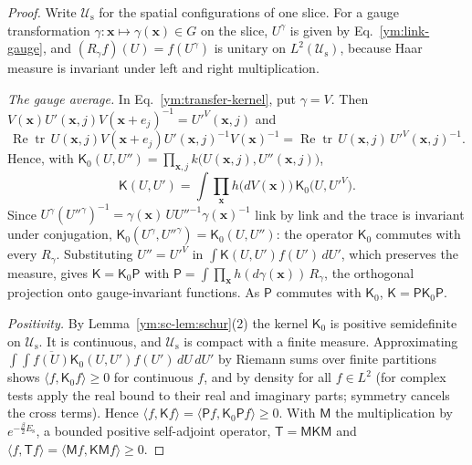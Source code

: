 \begin{proof}
Write $\mathcal U_{\mathrm s}$ for the spatial configurations of one slice.
For a gauge transformation $\gamma\colon\mathbf x\mapsto\gamma(\mathbf x)\in G$
on the slice, $U^\gamma$ is given by Eq.~\eqref{ym:link-gauge}, and
$(R_\gamma f)(U)=f(U^\gamma)$ is unitary on $L^2(\mathcal U_{\mathrm s})$,
because Haar measure is invariant under left and right multiplication.

\emph{The gauge average.} In Eq.~\eqref{ym:transfer-kernel}, put
$\gamma=V$. Then
$V(\mathbf x)U'(\mathbf x,j)V(\mathbf x+e_j)^{-1}=U'^{V}(\mathbf x,j)$ and
\begin{equation}
 \operatorname{Re}\operatorname{tr}\,U(\mathbf x,j)V(\mathbf x+e_j)
 U'(\mathbf x,j)^{-1}V(\mathbf x)^{-1}
 =\operatorname{Re}\operatorname{tr}\,U(\mathbf x,j)\,
 U'^{V}(\mathbf x,j)^{-1}.
\end{equation}
Hence, with $\mathsf K_0(U,U'')=\prod_{\mathbf x,j}k\big(U(\mathbf x,j),
U''(\mathbf x,j)\big)$,
\begin{equation}\label{ym:sc-gauge-average}
 \mathsf K(U,U')=\int\prod_{\mathbf x}h\big(dV(\mathbf x)\big)\,
 \mathsf K_0\big(U,U'^{V}\big).
\end{equation}
Since $U^\gamma(U''^\gamma)^{-1}=\gamma(\mathbf x)\,UU''^{-1}\gamma(\mathbf
x)^{-1}$ link by link and the trace is invariant under conjugation,
$\mathsf K_0(U^\gamma,U''^\gamma)=\mathsf K_0(U,U'')$: the operator
$\mathsf K_0$ commutes with every $R_\gamma$. Substituting $U''=U'^V$ in
$\int\mathsf K(U,U')f(U')\,dU'$, which preserves the measure, gives
$\mathsf K=\mathsf K_0\mathsf P$ with
$\mathsf P=\int\prod_{\mathbf x}h(d\gamma(\mathbf x))\,R_\gamma$, the orthogonal
projection onto gauge-invariant functions. As $\mathsf P$ commutes with
$\mathsf K_0$, $\mathsf K=\mathsf P\mathsf K_0\mathsf P$.

\emph{Positivity.} By Lemma~\ref{ym:sc-lem:schur}(2) the kernel $\mathsf K_0$ is
positive semidefinite on $\mathcal U_{\mathrm s}$. It is continuous, and
$\mathcal U_{\mathrm s}$ is compact with a finite measure. Approximating
$\int\int \overline{f(U)}\mathsf K_0(U,U')f(U')\,dU\,dU'$ by Riemann sums over finite
partitions shows $\langle f,\mathsf K_0f\rangle\ge0$ for continuous $f$, and by
density for all $f\in L^2$ (for complex tests apply the real bound to
their real and imaginary parts; symmetry cancels the cross terms). Hence
$\langle f,\mathsf Kf\rangle=\langle\mathsf Pf,\mathsf K_0\mathsf Pf\rangle\ge0$.
With $\mathsf M$ the multiplication by $e^{-\frac\beta2E_{\mathrm s}}$, a
bounded positive self-adjoint operator, $\mathsf T=\mathsf M\mathsf K\mathsf M$
and $\langle f,\mathsf Tf\rangle=\langle\mathsf Mf,\mathsf K\mathsf Mf\rangle
\ge0$.


\end{proof}
